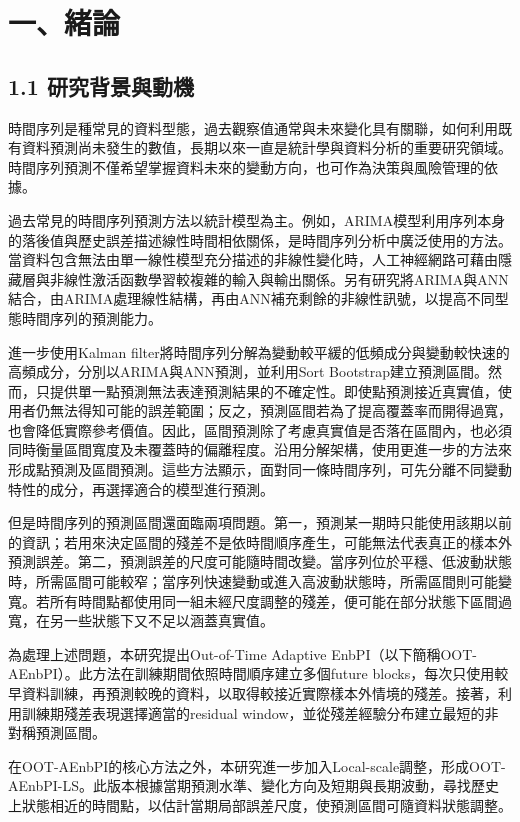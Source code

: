 \chapter*{一、緒論}
\section*{1.1 研究背景與動機}

時間序列是種常見的資料型態，過去觀察值通常與未來變化具有關聯，如何利用既有資料預測尚未發生的數值，長期以來一直是統計學與資料分析的重要研究領域。時間序列預測不僅希望掌握資料未來的變動方向，也可作為決策與風險管理的依據。

過去常見的時間序列預測方法以統計模型為主。例如，ARIMA模型利用序列本身的落後值與歷史誤差描述線性時間相依關係，是時間序列分析中廣泛使用的方法\cite{boxjenkins2015}。當資料包含無法由單一線性模型充分描述的非線性變化時，人工神經網路可藉由隱藏層與非線性激活函數學習較複雜的輸入與輸出關係。另有研究將ARIMA與ANN結合，由ARIMA處理線性結構，再由ANN補充剩餘的非線性訊號，以提高不同型態時間序列的預測能力\cite{zhang2003,khashei2011}。

\cite{lin2024thesis}進一步使用Kalman filter將時間序列分解為變動較平緩的低頻成分與變動較快速的高頻成分，分別以ARIMA與ANN預測，並利用Sort Bootstrap建立預測區間。然而，只提供單一點預測無法表達預測結果的不確定性。即使點預測接近真實值，使用者仍無法得知可能的誤差範圍；反之，預測區間若為了提高覆蓋率而開得過寬，也會降低實際參考價值。因此，區間預測除了考慮真實值是否落在區間內，也必須同時衡量區間寬度及未覆蓋時的偏離程度。\cite{hung2026thesis}沿用\cite{lin2024thesis}分解架構，使用更進一步的方法來形成點預測及區間預測。這些方法顯示，面對同一條時間序列，可先分離不同變動特性的成分，再選擇適合的模型進行預測。

但是時間序列的預測區間還面臨兩項問題。第一，預測某一期時只能使用該期以前的資訊；若用來決定區間的殘差不是依時間順序產生，可能無法代表真正的樣本外預測誤差。第二，預測誤差的尺度可能隨時間改變。當序列位於平穩、低波動狀態時，所需區間可能較窄；當序列快速變動或進入高波動狀態時，所需區間則可能變寬。若所有時間點都使用同一組未經尺度調整的殘差，便可能在部分狀態下區間過寬，在另一些狀態下又不足以涵蓋真實值。

為處理上述問題，本研究提出Out-of-Time Adaptive EnbPI（以下簡稱OOT-AEnbPI）。此方法在訓練期間依照時間順序建立多個future blocks，每次只使用較早資料訓練，再預測較晚的資料，以取得較接近實際樣本外情境的殘差。接著，利用訓練期殘差表現選擇適當的residual window，並從殘差經驗分布建立最短的非對稱預測區間。

在OOT-AEnbPI的核心方法之外，本研究進一步加入Local-scale調整，形成OOT-AEnbPI-LS。此版本根據當期預測水準、變化方向及短期與長期波動，尋找歷史上狀態相近的時間點，以估計當期局部誤差尺度，使預測區間可隨資料狀態調整。

